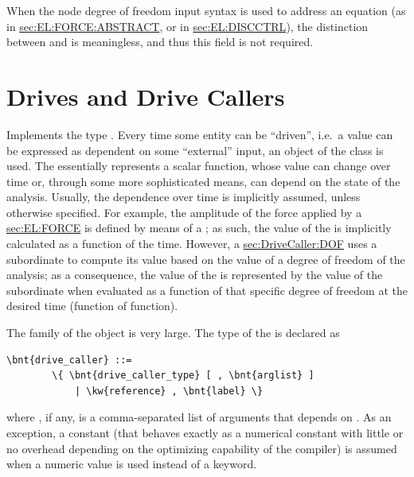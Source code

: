 When the node degree of freedom input syntax is used to address
an equation (as in
\hyperref{\kw{abstract} force elements}{\kw{abstract} force elements, Section~}{}{sec:EL:FORCE:ABSTRACT},
or in
\hyperref{\kw{discrete control} elements}{\kw{discrete control} elements, Section~}{}{sec:EL:DISCCTRL}),
the distinction between  and  is meaningless,
and thus this field is not required.




\section{Drives and Drive Callers}\label{sec:DriveCaller}
Implements the type .
Every time some entity can be ``driven'', i.e.\ a value can be
expressed as dependent on some ``external'' input, an object of the class 
 is used. 
The  essentially represents a scalar function, whose
value can change over time or, through some more sophisticated
means, can depend on the state of the analysis.
Usually, the dependence over time is implicitly assumed, unless
otherwise specified.
For example, the amplitude of the force applied by a 
\hyperref{\kw{force} element}{\kw{force} element (see Section~}{)}{sec:EL:FORCE}
is defined by means of a ; as such, the value of the  
is implicitly calculated as a function of the time.
However, a 
\hyperref{\kw{dof drive}}{\kw{dof drive} (see Section~}{)}{sec:DriveCaller:DOF}
uses a subordinate  to compute its value based on the value
of a degree of freedom of the analysis; as a consequence,
the value of the  is represented by the
value of the subordinate  when evaluated as a function
of that specific degree of freedom at the desired time (function of function).

The family of the  object is very large.
The type of the  is declared as
\begin{Verbatim}[commandchars=\\\{\}]
    \bnt{drive_caller} ::=
        \{ \bnt{drive_caller_type} [ , \bnt{arglist} ]
            | \kw{reference} , \bnt{label} \}
\end{Verbatim}    
where , if any, is a comma-separated list of arguments
that depends on .
As an exception, a constant  (that behaves exactly as a
numerical constant with little or no overhead depending on the optimizing
capability of the compiler) is assumed when a numeric value is used instead
of a keyword.


